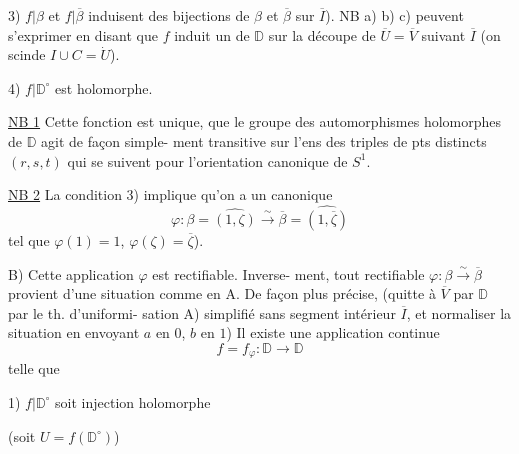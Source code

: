 
3) $f|\beta$ et $f|\overline\beta$ induisent des bijections de
$\beta$ et $\overline\beta$ sur $\overline I$).
NB a) b) c) peuvent
s'exprimer en disant que $f$ induit un
 de $\mathbb D$ sur la découpe de $\overline U=\overline V$
suivant $\overline I$ (on scinde $I\cup C=\dot U$).

4) $f|\mathbb D^\circ$ est holomorphe.

\uline{NB 1} Cette fonction est unique, 
que le groupe des automorphismes 
holomorphes de $\mathbb D$ agit de façon simple-
ment transitive sur l'ens des
triples  de pts distincts $(r,s,t)$  qui se
suivent pour l'orientation canonique de
 $S^1$. 

\uline{NB 2} La condition 3) implique qu'on a un
 canonique
\[
\varphi:\beta=\widehat{(1,\zeta)}\overset\sim\longrightarrow
\overline\beta=\widehat{(1,\overline\zeta)}
\]
tel que $\varphi(1)=1$, $\varphi(\zeta)=\overline\zeta$).

B) Cette application $\varphi$ est rectifiable. Inverse-
ment, tout  rectifiable $\varphi:\beta\overset\sim\longrightarrow\overline\beta$
provient d'une situation comme en A.
De façon plus précise,  (quitte
à  $\overline V$ par $\mathbb D$ par le th. d'uniformi-
sation A) simplifié sans segment intérieur $\overline I$,
et normaliser la situation en  envoyant
$a$ en $0$, $b$ en $1$)  Il existe
une application continue
\[
f=f_\varphi:\mathbb D\longrightarrow\mathbb D
\]
telle que

1) $f|\mathbb D^\circ$ soit  injection holomorphe

(soit $U=f(\mathbb D^\circ)$)

